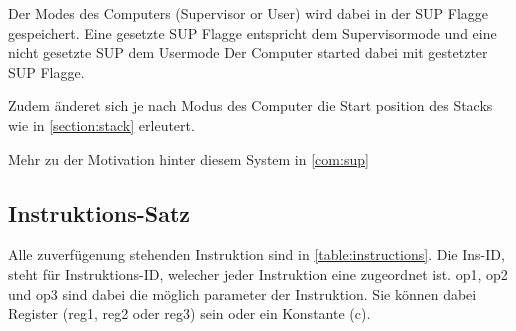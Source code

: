 \documentclass{scrartcl}
\begin{document}
Der Modes des Computers (Supervisor or User) wird dabei in der SUP Flagge gespeichert. Eine gesetzte SUP Flagge entspricht dem Supervisormode und eine nicht gesetzte SUP dem Usermode Der Computer started dabei mit gestetzter SUP Flagge.

Zudem änderet sich je nach Modus des Computer die Start position des Stacks wie in \autoref{section:stack} erleutert.

Mehr zu der Motivation hinter diesem System in \autoref{com:sup}

\subsection{\label{section:insSet}Instruktions-Satz}

Alle zuverfügenung stehenden Instruktion sind in \autoref{table:instructions}. Die Ins-ID, steht für Instruktions-ID, welecher jeder Instruktion eine zugeordnet ist. op1, op2 und op3 sind dabei die möglich parameter der Instruktion. Sie können dabei Register (reg1, reg2 oder reg3) sein oder ein Konstante (c).
\end{document}
